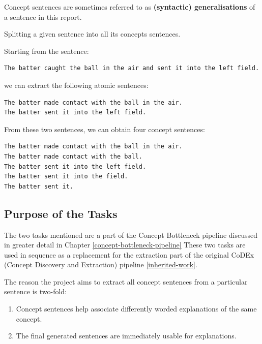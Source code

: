Concept sentences are sometimes referred to as \textbf{(syntactic) generalisations} of a sentence in this report.


\begin{example}
Splitting a given sentence into all its concepts sentences.

Starting from the sentence:  
\begin{verbatim}
The batter caught the ball in the air and sent it into the left field.
\end{verbatim}
we can extract the following atomic sentences: 
\begin{verbatim}
The batter made contact with the ball in the air. 
The batter sent it into the left field.
\end{verbatim}
From these two sentences, we can obtain four concept sentences: 
\begin{verbatim}
The batter made contact with the ball in the air.
The batter made contact with the ball.
The batter sent it into the left field.
The batter sent it into the field.
The batter sent it.
\end{verbatim}

\end{example}

\subsection{Purpose of the Tasks}

The two tasks mentioned are a part of the Concept Bottleneck pipeline discussed in greater detail in Chapter \ref{concept-bottleneck-pipeline}
These two tasks are used in sequence as a replacement for the extraction part of the original CoDEx (Concept Discovery and Extraction) pipeline \ref{inherited-work}.

The reason the project aims to extract all concept sentences from a particular sentence is two-fold:
\begin{enumerate}
    \item Concept sentences help associate differently worded explanations of the same concept.
    \item The final generated sentences are immediately usable for explanations.
\end{enumerate}

